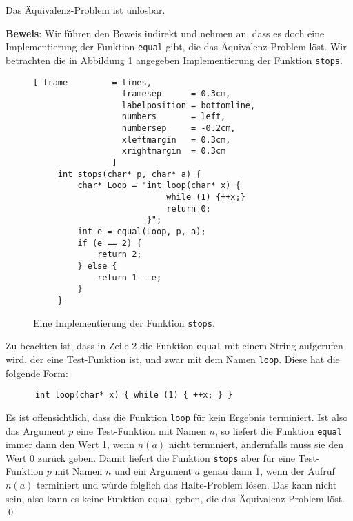 \begin{Satz}[Rice]
Das \"Aquivalenz-Problem ist unl\"osbar.  
\end{Satz}

\noindent
\textbf{Beweis}:
Wir f\"uhren den Beweis indirekt und nehmen
an, dass es doch eine Implementierung der Funktion \texttt{equal} gibt, die das
\"Aquivalenz-Problem l\"ost.  Wir betrachten die in Abbildung 
\ref{fig:stops} angegeben Implementierung der Funktion \texttt{stops}.


\begin{figure}[!h]
  \centering
\begin{Verbatim}[ frame         = lines, 
                  framesep      = 0.3cm, 
                  labelposition = bottomline,
                  numbers       = left,
                  numbersep     = -0.2cm,
                  xleftmargin   = 0.3cm,
                  xrightmargin  = 0.3cm
                ]
     int stops(char* p, char* a) {
         char* Loop = "int loop(char* x) { 
                           while (1) {++x;}
                           return 0; 
                       }";
         int e = equal(Loop, p, a);
         if (e == 2) {
             return 2;
         } else {
             return 1 - e;
         }
     }
\end{Verbatim}
  \vspace*{-0.3cm}
  \caption{Eine Implementierung der Funktion \texttt{stops}.}
  \label{fig:stops}
\end{figure}

Zu beachten ist, dass in Zeile 2 die Funktion \texttt{equal} mit einem String aufgerufen
wird, der eine Test-Funktion ist, und zwar mit dem Namen \texttt{loop}.  Diese hat die
folgende Form:
\begin{verbatim}
      int loop(char* x) { while (1) { ++x; } }
\end{verbatim}
Es ist offensichtlich, dass die Funktion \texttt{loop} f\"ur kein Ergebnis terminiert.
Ist also das Argument $p$ eine Test-Funktion mit Namen $n$, so liefert die Funktion \texttt{equal} immer dann den Wert 1,
wenn $n(a)$ nicht terminiert, andernfalls muss sie den Wert 0 zur\"uck geben.
Damit liefert die Funktion \texttt{stops} aber f\"ur eine Test-Funktion $p$ mit Namen $n$ und ein Argument
$a$ genau dann 1, wenn der Aufruf $n(a)$ terminiert und w\"urde folglich das Halte-Problem
l\"osen.  Das kann nicht sein, also kann es keine Funktion  \texttt{equal}
geben, die das \"Aquivalenz-Problem l\"ost. 
\qed
\vspace*{0.3cm}

